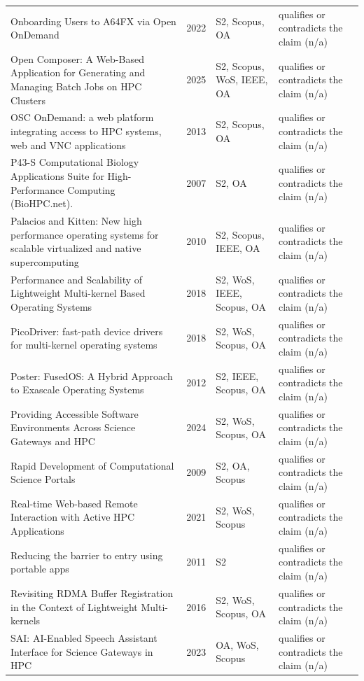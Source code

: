 \begin{longtable}{@{}%
  >{\raggedright\arraybackslash}p{}c%
  >{\raggedright\arraybackslash}p{}%
  >{\raggedright\arraybackslash}p{}@{}}
Onboarding Users to A64FX via Open OnDemand & 2022 & S2, Scopus, OA & qualifies or contradicts the claim (n/a) \\
Open Composer: A Web-Based Application for Generating and Managing Batch Jobs on HPC Clusters & 2025 & S2, Scopus, WoS, IEEE, OA & qualifies or contradicts the claim (n/a) \\
OSC OnDemand: a web platform integrating access to HPC systems, web and VNC applications & 2013 & S2, Scopus, OA & qualifies or contradicts the claim (n/a) \\
P43-S Computational Biology Applications Suite for High-Performance Computing (BioHPC.net). & 2007 & S2, OA & qualifies or contradicts the claim (n/a) \\
Palacios and Kitten: New high performance operating systems for scalable virtualized and native supercomputing & 2010 & S2, Scopus, IEEE, OA & qualifies or contradicts the claim (n/a) \\
Performance and Scalability of Lightweight Multi-kernel Based Operating Systems & 2018 & S2, WoS, IEEE, Scopus, OA & qualifies or contradicts the claim (n/a) \\
PicoDriver: fast-path device drivers for multi-kernel operating systems & 2018 & S2, WoS, Scopus, OA & qualifies or contradicts the claim (n/a) \\
Poster: FusedOS: A Hybrid Approach to Exascale Operating Systems & 2012 & S2, IEEE, Scopus, OA & qualifies or contradicts the claim (n/a) \\
Providing Accessible Software Environments Across Science Gateways and HPC & 2024 & S2, WoS, Scopus, OA & qualifies or contradicts the claim (n/a) \\
Rapid Development of Computational Science Portals & 2009 & S2, OA, Scopus & qualifies or contradicts the claim (n/a) \\
Real-time Web-based Remote Interaction with Active HPC Applications & 2021 & S2, WoS, Scopus & qualifies or contradicts the claim (n/a) \\
Reducing the barrier to entry using portable apps & 2011 & S2 & qualifies or contradicts the claim (n/a) \\
Revisiting RDMA Buffer Registration in the Context of Lightweight Multi-kernels & 2016 & S2, WoS, Scopus, OA & qualifies or contradicts the claim (n/a) \\
SAI: AI-Enabled Speech Assistant Interface for Science Gateways in HPC & 2023 & OA, WoS, Scopus & qualifies or contradicts the claim (n/a) \\

\end{longtable}
